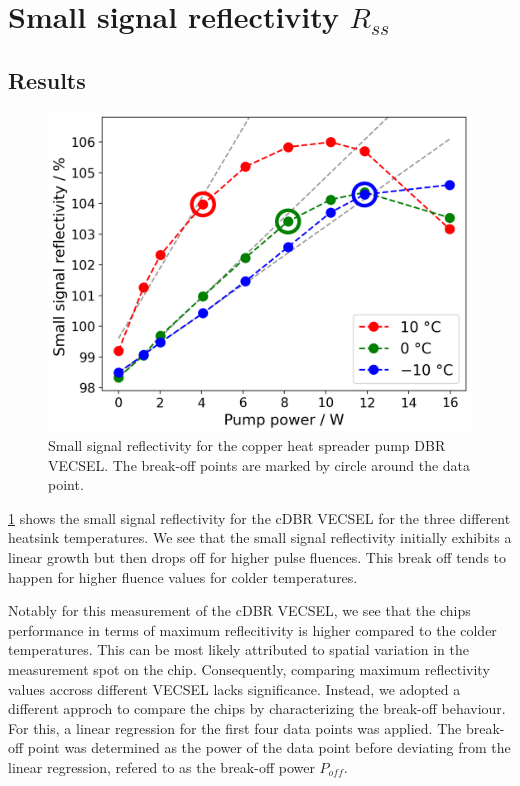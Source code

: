 \section{\texorpdfstring{Small signal reflectivity $R_{ss}$}{Small signal reflectivity Rss}}
\subsection*{Results}

\begin{figure}
    \vspace{-\baselineskip}
    \centering
    \includegraphics[width=.98\textwidth]{images/param1.png}
    \caption{Small signal reflectivity for the copper heat spreader pump DBR VECSEL. The break-off points are marked by circle around the data point.}
    \label{fig:rss}
\end{figure}

\cref{fig:rss} shows the small signal reflectivity for the cDBR VECSEL for the three different heatsink temperatures.
We see that the small signal reflectivity initially exhibits a linear growth but then drops off for higher pulse fluences. This break off tends to happen for higher fluence values for colder temperatures.

Notably for this measurement of the cDBR VECSEL, we see that the chips performance in terms of maximum reflecitivity is higher compared to the colder temperatures. This can be most likely attributed to spatial variation in the measurement spot on the chip. Consequently, comparing maximum reflectivity values accross different VECSEL lacks significance. Instead, we adopted a different approch to compare the chips by characterizing the break-off behaviour. For this, a linear regression for the first four data points was applied. The break-off point was determined as the power of the data point before deviating from the linear regression, refered to as the break-off power $P_{off}$.


